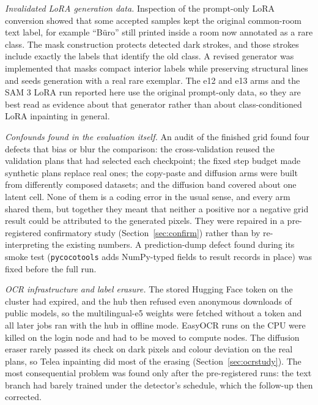 \emph{Invalidated LoRA generation data.} Inspection of the prompt-only LoRA
conversion showed that some accepted samples kept the original common-room text
label, for example ``B\"uro'' still printed inside a room now annotated as a
rare class. The mask construction protects detected dark strokes, and those
strokes include exactly the labels that identify the old class. A revised
generator was implemented that masks compact interior labels while preserving
structural lines and seeds generation with a real rare exemplar. The e12 and e13
arms and the SAM 3 LoRA run reported here use the original prompt-only data, so
they are best read as evidence about that generator rather than about
class-conditioned LoRA inpainting in general.

\emph{Confounds found in the evaluation itself.} An audit of the finished
grid found four defects that bias or blur the comparison: the
cross-validation reused the validation plans that had selected each
checkpoint; the fixed step budget made synthetic plans replace real ones; the
copy-paste and diffusion arms were built from differently composed datasets;
and the diffusion band covered about one latent cell. None of them is a coding
error in the usual sense, and every arm shared them, but together they meant
that neither a positive nor a negative grid result could be attributed to the
generated pixels. They were repaired in a pre-registered confirmatory study
(Section~\ref{sec:confirm}) rather than by re-interpreting the existing
numbers. A prediction-dump defect found during its smoke test
(\texttt{pycocotools} adds NumPy-typed fields to result records in place) was
fixed before the full run.

\emph{OCR infrastructure and label erasure.} The stored Hugging Face token on
the cluster had expired, and the hub then refused even anonymous downloads of
public models, so the multilingual-e5 weights were fetched without a token and
all later jobs ran with the hub in offline mode. EasyOCR runs on the CPU were
killed on the login node and had to be moved to compute nodes. The diffusion
eraser rarely passed its check on dark pixels and colour deviation on the real
plans, so Telea inpainting did most of the erasing
(Section~\ref{sec:ocrstudy}). The most consequential problem was found only
after the pre-registered runs: the text branch had barely trained under the
detector's schedule, which the follow-up then corrected.
